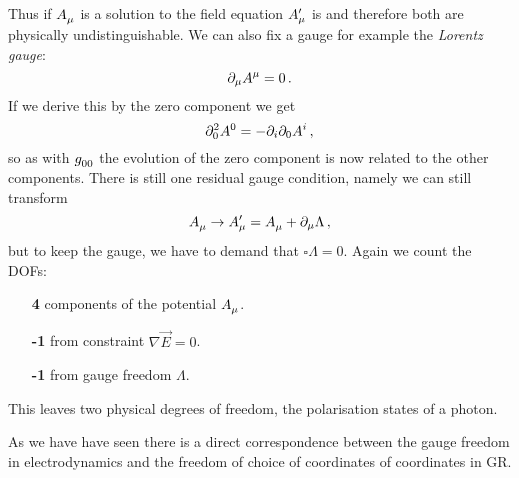 Thus if $\tensor{A}{_\mu}$ is a solution to the field
equation $\tensor*{A}{*_\mu^\prime}$ is and therefore both are physically
undistinguishable. We can also fix a gauge for example the \emph{Lorentz gauge}:
\begin{equation}
\partial_\mu\tensor{A}{^\mu}=0\, .
\end{equation}
If we derive this by the zero component we get
\begin{equation}
\partial_{0}^2\tensor{A}{^0}=-\partial_i\partial_0\tensor{A}{^i}\, ,
\end{equation}
so as with $\tensor{g}{_0_0}$ the evolution of the zero component is now related
to the other components. There is still one residual gauge condition, namely we can
still transform
\begin{equation}
\tensor{A}{_\mu}\to\tensor*{A}{*_\mu^\prime}=
\tensor{A}{_\mu}+\partial_\mu\Lambda\, ,
\end{equation}
but to keep the gauge, we have to demand that $\square\Lambda=0$.
Again we count the DOFs:
\begin{itemize}
  \item[\color{section_color}\textsf{\textbf{4}}] components of the potential
  $\tensor{A}{_\mu}$.
  \item[\color{section_color}\textsf{\textbf{-1}}] from constraint
  $\nabla\vec{E}=0$.
  \item[\color{section_color}\textsf{\textbf{-1}}] from gauge freedom
  $\Lambda$.
\end{itemize}
This leaves two physical degrees of freedom, the polarisation states of a
photon.
\begin{remark}
As we have have seen there is a direct correspondence between the gauge freedom
in electrodynamics and the freedom of choice of coordinates of coordinates in
GR.
\end{remark}
